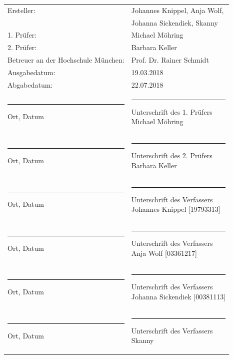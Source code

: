 	
\newpage
\thispagestyle{empty}
\begin{flushleft}	
	\begin{tabular}[H]{ll}
		
		Ersteller: & \large{Johannes Knippel, Anja Wolf,}\\[0.2cm]
		 			& \large{Johanna Sickendiek, Skanny}\\[0,2cm]
		1. Prüfer:		  & \large{Michael Möhring}\\[0.2cm]
		2. Prüfer:		  & \large{Barbara Keller}\\[.7cm]
		
		
		Betreuer an der Hochschule München: 	& \large{Prof. Dr. Rainer Schmidt}\\[0.5cm]
		Ausgabedatum:					& \large{19.03.2018}\\[0.5cm]
		Abgabedatum:					& \large{22.07.2018}\\[3.5cm]
	
		
	
		\parbox{7cm}{\hrule\medskip Ort, Datum\\ [0.3cm]}	&	\parbox{7cm}{\hrule\medskip Unterschrift des 1. Prüfers\\ [0.2cm]Michael Möhring}\\[1.5cm]
		\parbox{7cm}{\hrule\medskip Ort, Datum\\ [0.31cm]}	&	\parbox{7cm}{\hrule\medskip Unterschrift des 2. Prüfers\\ [0.2cm]Barbara Keller}\\[1.5cm]
		\parbox{7cm}{\hrule\medskip Ort, Datum\\ [0.33cm]}	&	\parbox{7cm}{\hrule\medskip Unterschrift des Verfassers\\ [0.2cm]Johannes Knippel [19793313]}\\[1.5cm]
		\parbox{7cm}{\hrule\medskip Ort, Datum\\ [0.33cm]}	&	\parbox{7cm}{\hrule\medskip Unterschrift des Verfassers\\ [0.2cm]Anja Wolf [03361217]}\\[1.5cm]
		\parbox{7cm}{\hrule\medskip Ort, Datum\\ [0.33cm]}	&	\parbox{7cm}{\hrule\medskip Unterschrift des Verfassers\\ [0.2cm]Johanna Sickendiek [00381113]}\\[1.5cm]
		\parbox{7cm}{\hrule\medskip Ort, Datum\\ [0.33cm]}	&	\parbox{7cm}{\hrule\medskip Unterschrift des Verfassers\\ [0.2cm]Skanny}\\
	\end{tabular}
\end{flushleft}

	
	
	
